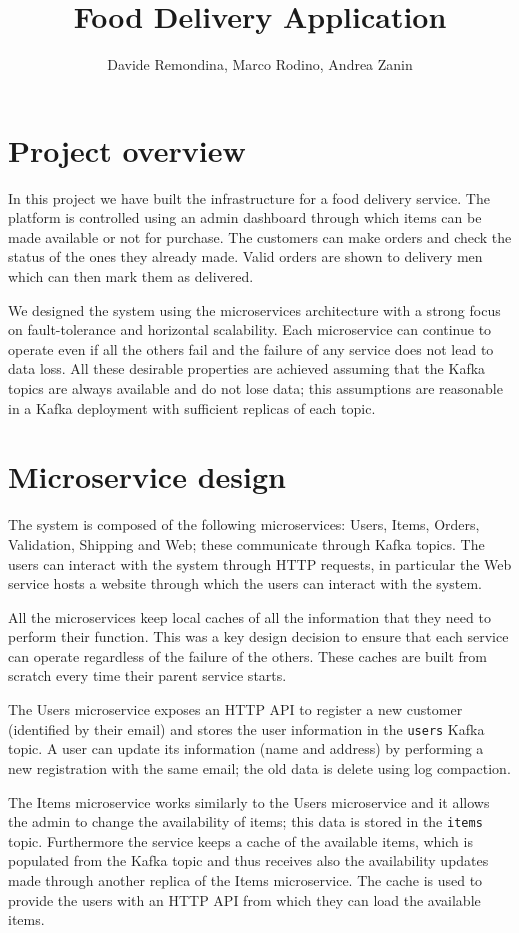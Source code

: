 \documentclass{article}
\title{Food Delivery Application}
\author{Davide Remondina, Marco Rodino, Andrea Zanin}
\begin{document}
\maketitle

\section{Project overview}
In this project we have built the infrastructure for a food delivery service. The platform is controlled using an admin dashboard through which items can be made available or not for purchase. The customers can make orders and check the status of the ones they already made. Valid orders are shown to delivery men which can then mark them as delivered.

We designed the system using the microservices architecture with a strong focus on fault-tolerance and horizontal scalability. Each microservice can continue to operate even if all the others fail and the failure of any service does not lead to data loss. All these desirable properties are achieved assuming that the Kafka topics are always available and do not lose data; this assumptions are reasonable in a Kafka deployment with sufficient replicas of each topic.

\section{Microservice design}
The system is composed of the following microservices: Users, Items, Orders, Validation, Shipping and Web; these communicate through Kafka topics. The users can interact with the system through HTTP requests, in particular the Web service hosts a website through which the users can interact with the system.

All the microservices keep local caches of all the information that they need to perform their function. This was a key design decision to ensure that each service can operate regardless of the failure of the others. These caches are built from scratch every time their parent service starts.

The Users microservice exposes an HTTP API to register a new customer (identified by their email) and stores the user information in the \texttt{users} Kafka topic. A user can update its information (name and address) by performing a new registration with the same email; the old data is delete using log compaction.

The Items microservice works similarly to the Users microservice and it allows the admin to change the availability of items; this data is stored in the \texttt{items} topic. Furthermore the service keeps a cache of the available items, which is populated from the Kafka topic and thus receives also the availability updates made through another replica of the Items microservice. The cache is used to provide the users with an HTTP API from which they can load the available items.
\end{document}
